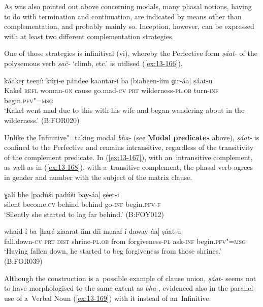  As was also pointed out above concerning modals, many phasal notions, having to do with termination and continuation, are indicated by means other than complementation, and probably mainly so. Inception, however, can be expressed with at least two different complementation strategies.


One of those strategies is infinitival (vi), whereby the Perfective form \textit{ṣáat-} of the polysemous verb \textit{ṣač-} `climb, etc.' is utilised (\ref{ex:13-166}). 

\begin{exe}
\ex
\label{ex:13-166}
\gll káakeṛ teeṇíi kúṛi-e pándee kaantar-í ba  [biabeen-íim ɡir-áa] ṣáat-u \\
Kakel \textsc{ refl} woman-\textsc{gn} cause go.mad-\textsc{cv} \textsc{prt}  wilderness-\textsc{pl.ob} turn-\textsc{inf} begin.\textsc{pfv"=msg} \\
\glt `Kakel went mad due to this with his wife and began wandering about in the wilderness.' (B:FOR020) 
\end{exe}

Unlike the Infinitive"=taking modal \textit{bha-} (see \textbf{Modal predicates} above), \textit{ṣáat-} is confined to the Perfective and remains intransitive, regardless of the transitivity of the complement predicate. In (\ref{ex:13-167}), with an~intransitive complement, as well as in (\ref{ex:13-168}), with a~transitive complement, the phasal verb agrees in gender and number with the subject of the matrix clause.

\begin{exe}
\ex
\label{ex:13-167}
\gll ɣalí bhe [padúši padúši bay-áa] ṣéet-i  \\
silent become.\textsc{cv} behind behind go-\textsc{inf} begin.\textsc{pfv-f} \\
\glt `Silently she started to lag far behind.' (B:FOY012)

\ex
\label{ex:13-168}
\gll whaid-í ba [haṛé ziaarat-íim díi  muaaf-í daway-áa] ṣáat-u \\
fall.down-\textsc{cv} \textsc{prt} \textsc{dist} shrine-\textsc{pl.ob} from forgiveness-\textsc{pl} ask-\textsc{inf} begin.\textsc{pfv"=msg}  \\
\glt `Having fallen down, he started to beg forgiveness from those shrines.' (B:FOR039) 
\end{exe}

Although the construction is a~possible example of clause union, \textit{ṣáat-} seems not to have morphologised to the same extent as \textit{bha-}, evidenced also in the parallel use of a~Verbal Noun (\ref{ex:13-169}) with it instead of an~Infinitive. 

